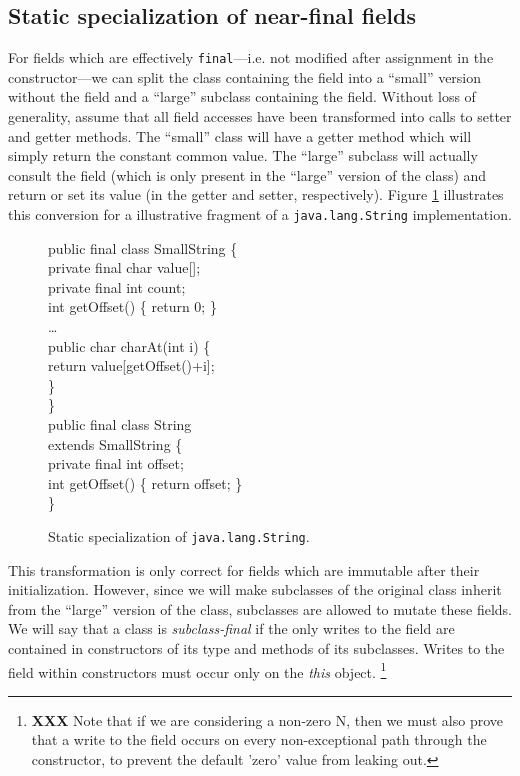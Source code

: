 \documentclass[preprint]{acmconf}
\begin{document}
\subsection{Static specialization of near-final fields}
For fields which are effectively {\tt final}---i.e. not modified after
assignment in the constructor---we can split the class containing the
field into a ``small'' version without the field and a ``large''
subclass containing the field.  Without loss of generality, assume
that all field accesses have been transformed into calls to setter and
getter methods.  The ``small'' class will have a getter method
which will simply return the constant common value.  The ``large''
subclass will actually consult the field (which is only present in the
``large'' version of the class) and return or set its value (in the
getter and setter, respectively).  Figure \ref{fig:big-small} illustrates this
conversion for a illustrative fragment of a {\tt java.lang.String}
implementation.
\begin{figure}
\begin{samplecode}
public final class SmallString \{\\
\>private final char value[];\\
\>private final int count;\\
\>int getOffset() \{ return 0; \}\\
\>\ldots\\
\>public char charAt(int i) \{\\
\>\>return value[getOffset()+i];\\
\>\}\\
\}\\
public final class String\\
\>\>extends SmallString \{\\
\>private final int offset;\\
\>int getOffset() \{ return offset; \}\\
\}\\
\end{samplecode}
\caption{Static specialization of {\tt java.lang.String}.}
\label{fig:big-small}
\end{figure}

This transformation is only correct for fields which are immutable
after their initialization.  However, since we will make subclasses of the
original class inherit from the ``large'' version of the class,
subclasses are allowed to mutate these fields.  We will say that
a class is {\it subclass-final} if the only writes to the field
are contained in constructors of its type and methods of its
subclasses.  Writes to the field within constructors must occur only on
the {\it this} object.%
\footnote{{\bf XXX} Note that if we are considering a non-zero N, then
  we must also prove that a write to the field occurs on every
  non-exceptional path through the constructor, to prevent the default
  'zero' value from leaking out.}
\end{document}
